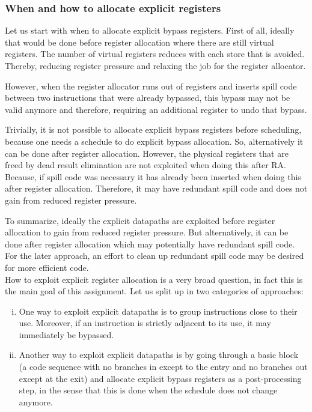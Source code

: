 \subsubsection{When and how to allocate explicit registers}
Let us start with when to allocate explicit bypass registers. First of all, ideally that would be done before register allocation where there are still virtual registers. The number of virtual registers reduces with each store that is avoided. Thereby, reducing register pressure and relaxing the job for the register allocator.

However, when the register allocator runs out of registers and inserts spill code between two instructions that were already bypassed, this bypass may not be valid anymore and therefore, requiring an additional register to undo that bypass.

Trivially, it is not possible to allocate explicit bypass registers before scheduling, because one needs a schedule to do explicit bypass allocation. %
So, alternatively it can be done after register allocation. However, the physical registers that are freed by dead result elimination are not exploited when doing this after RA. Because, if spill code was necessary it has already been inserted when doing this after register allocation. Therefore, it may have redundant spill code and does not gain from reduced register pressure.

To summarize, ideally the explicit datapaths are exploited before register allocation to gain from reduced register pressure. But alternatively, it can be done after register allocation which may potentially have redundant spill code. For the later approach, an effort to clean up redundant spill code may be desired for more efficient code.\\

How to exploit explicit register allocation is a very broad question, in fact this is the main goal of this assignment. Let us split up in two categories of approaches:
\begin{enumerate}[i.]
  \item One way to exploit explicit datapaths is to group instructions close to their use. Moreover, if an instruction is strictly adjacent to its use, it may immediately be bypassed.%
  \item Another way to exploit explicit datapaths is by going through a basic block (a code sequence with no branches in except to the entry and no branches out except at the exit) and allocate explicit bypass registers as a post-processing step, in the sense that this is done when the schedule does not change anymore.
\end{enumerate}

